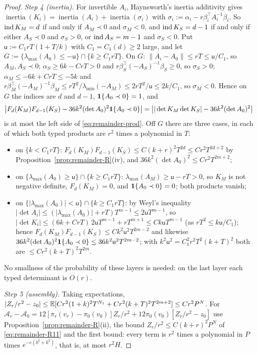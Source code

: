 \begin{proof}
\emph{Step 4 (inertia).} For invertible $A_i$, Haynsworth's inertia additivity gives $\operatorname{inertia}(K_i)=\operatorname{inertia}(A_i)+\operatorname{inertia}(\sigma_i)$ with $\sigma_i:=\alpha_i-r\beta_i^{\top}A_i^{-1}\beta_i$. So $\operatorname{ind} K_M=d$ if and only if $A_M\prec0$ and $\sigma_M<0$, and $\operatorname{ind} K_S=d-1$ if and only if either $A_S\prec0$ and $\sigma_S>0$, or $\operatorname{ind} A_S=m-1$ and $\sigma_S<0$. Put $\mathsf u:=C_1rT(1+T/k)$ with $C_1=C_1(d)\ge2$ large, and let $G:=\{\lambda_{\max}(A_0)\le-\mathsf u\}\cap\{k\ge C_1rT\}$. On $G$: $\|A_i-A_0\|\le rT\le\mathsf u/C_1$, so $A_M,A_S\prec0$; $\alpha_S\ge6k-CrT>0$ and $r\beta_S^{\top}(-A_S)^{-1}\beta_S\ge0$, so $\sigma_S>0$; $\alpha_M\le-6k+CrT\le-5k$ and $r\beta_M^{\top}(-A_M)^{-1}\beta_M\le rT^2/\lambda_{\min}(-A_M)\le2rT^2/\mathsf u\le2k/C_1$, so $\sigma_M<0$. Hence on $G$ the indices are $d$ and $d-1$, $\mathbf 1\{A_0\prec0\}=1$, and
\[
\bigl|F_d(K_M)F_{d-1}(K_S)-36k^2(\det A_0)^2\mathbf 1\{A_0\prec0\}\bigr|=\bigl||\det K_M\det K_S|-36k^2(\det A_0)^2\bigr|
\]
is at most the left side of \eqref{eq:remainder-prod}. Off $G$ there are three cases, in each of which both typed products are $r^2$ times a polynomial in $T$:
\begin{itemize}[leftmargin=1.5em]
\item on $\{k<C_1rT\}$: $F_d(K_M)F_{d-1}(K_S)\le C(k+r)^2T^{2d}\le Cr^2T^{2d+2}$ by Proposition~\ref{prop:remainder-R}(iv), and $36k^2(\det A_0)^2\le Cr^2T^{2m+2}$;
\item on $\{\lambda_{\max}(A_0)\ge\mathsf u\}\cap\{k\ge C_1rT\}$: $\lambda_{\max}(A_M)\ge\mathsf u-rT>0$, so $K_M$ is not negative definite, $F_d(K_M)=0$, and $\mathbf 1\{A_0\prec0\}=0$; both products vanish;
\item on $\{|\lambda_{\max}(A_0)|<\mathsf u\}\cap\{k\ge C_1rT\}$: by Weyl's inequality $|\det A_i|\le(|\lambda_{\max}(A_0)|+rT)T^{m-1}\le2\mathsf uT^{m-1}$, so $|\det K_i|\le(6k+CrT)\,2\mathsf uT^{m-1}+rT^{m+1}\le Ck\mathsf uT^{m-1}$ (as $rT^2\le k\mathsf u/C_1$); hence $F_d(K_M)F_{d-1}(K_S)\le Ck^2\mathsf u^2T^{2m-2}$ and likewise $36k^2(\det A_0)^2\mathbf 1\{A_0\prec0\}\le36k^2\mathsf u^2T^{2m-2}$; with $k^2\mathsf u^2=C_1^2r^2T^2(k+T)^2$ both are $\le Cr^2(k+T)^2T^{2m}$.
\end{itemize}
No smallness of the probability of these layers is needed: on the last layer each typed determinant is $O(r)$.

\emph{Step 5 (assembly).} Taking expectations, $|Z_r/r^2-z_0|\le\mathbb E[Cr^2(1+k)^2T^{N_1}+Cr^2(k+T)^2T^{2m+2}]\le Cr^2P^N$. For $\mathcal A_r-\mathcal A_0=12[\pi_r(v_r)-\pi_0(v_0)]Z_r/r^2+12\pi_0(v_0)[Z_r/r^2-z_0]$ use Proposition~\ref{prop:remainder-R}(ii), the bound $Z_r/r^2\le C(k+r)^2P^N$ of \eqref{eq:remainder-R11} and the first bound: every term is $r^2$ times a polynomial in $P$ times $e^{-c(b^2+k^2)}$, that is, at most $r^2H$.
\end{proof}

